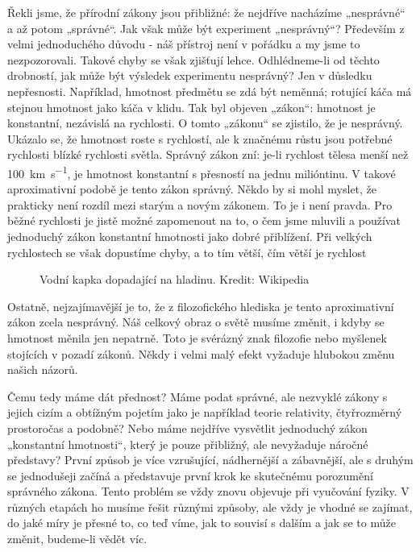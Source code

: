     Řekli jsme, že přírodní zákony jsou přibližné: že nejdříve nacházíme „nesprávné“ a až potom
    „správné“. Jak však může být experiment „nesprávný“? Především z velmi jednoduchého důvodu - náš
    přístroj není v pořádku a my jsme to nezpozorovali. Takové chyby se však zjišťují lehce.
    Odhlédneme-li od těchto drobností, jak může být výsledek experimentu nesprávný? Jen v důsledku
    nepřesnosti. Například, hmotnost předmětu se zdá být neměnná; rotující káča má stejnou hmotnost
    jako káča v klidu. Tak byl objeven „zákon“: hmotnost je konstantní, nezávislá na rychlosti. O
    tomto „zákonu“ se zjistilo, že je nesprávný. Ukázalo se, že hmotnost roste s rychlostí, ale k
    značnému růstu jsou potřebné rychlosti blízké rychlosti světla. Správný zákon zní: je-li
    rychlost tělesa menší než \SI{100}{\km\per\second}, je hmotnost konstantní s přesností na jednu
    milióntinu. V takové aproximativní podobě je tento zákon správný. Někdo by si mohl myslet, že
    prakticky není rozdíl mezi starým a novým zákonem. To je i není pravda. Pro běžné rychlosti je
    jistě možné zapomenout na to, o čem jsme mluvili a používat jednoduchý zákon konstantní
    hmotnosti jako dobré přiblížení. Při velkých rychlostech se však dopustíme chyby, a to tím
    větší, čím větší je rychlost

    \begin{figure}[ht!]  %
      \centering
      \caption{Vodní kapka dopadající na hladinu. Kredit: Wikipedia}
      \label{fyz:fig0891}
    \end{figure} 
    
    Ostatně, nejzajímavější je to, že z filozofického hlediska je tento aproximativní zákon zcela
    nesprávný. Náš celkový obraz o světě musíme změnit, i kdyby se hmotnost měnila jen nepatrně.
    Toto je svérázný znak filozofie nebo myšlenek stojících v pozadí zákonů. Někdy i velmi malý
    efekt vyžaduje hlubokou změnu našich názorů.
    
    Čemu tedy máme dát přednost? Máme podat správné, ale nezvyklé zákony s jejich cizím a obtížným
    pojetím jako je například teorie relativity, čtyřrozměrný prostoročas a podobně? Nebo máme
    nejdříve vysvětlit jednoduchý zákon „konstantní hmotnosti“, který je pouze přibližný, ale
    nevyžaduje náročné představy? První způsob je více vzrušující, nádhernější a zábavnější, ale s
    druhým se jednodušeji začíná a představuje první krok ke skutečnému porozumění správného zákona.
    Tento problém se vždy znovu objevuje při vyučování fyziky. V různých etapách ho musíme řešit
    různými způsoby, ale vždy je vhodné se zajímat, do jaké míry je přesné to, co teď víme, jak to
    souvisí s dalším a jak se to může změnit, budeme-li vědět víc.
    
